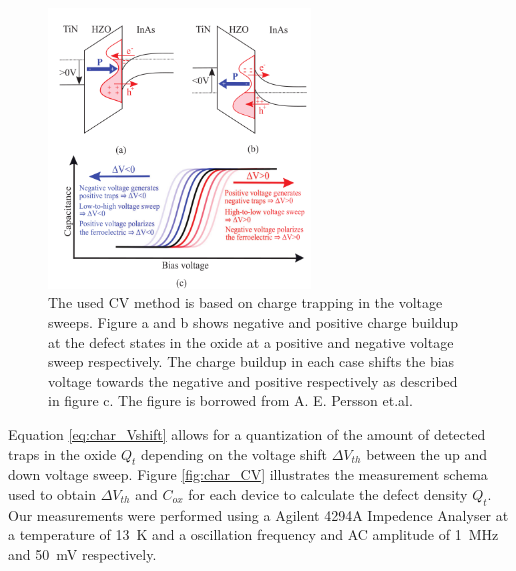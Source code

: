 \documentclass[11pt,twoside,final]{eitExjobb}  %
\begin{document}
\begin{figure}[htbp]
    \centering
    \includegraphics[width=0.62\textwidth]{fig/img/CV_hysteresis.png}
    \caption{The used CV method is based on charge trapping in the voltage
        sweeps. Figure a and b shows negative and positive charge buildup at
        the defect states in the oxide at a positive and negative voltage sweep
        respectively. The charge buildup in each case shifts the bias voltage
        towards the negative and positive respectively as described in figure
        c. The figure is borrowed from A. E. Persson et.al. \cite{persson2020method}}
    \label{fig:char_hysteresis}
\end{figure}

Equation \ref{eq:char_Vshift} allows for a quantization of the amount of
detected traps in the oxide $Q_t$ depending on the voltage shift $\Delta
V_{th}$ between the up and down voltage sweep. Figure \ref{fig:char_CV}
illustrates the measurement schema used to obtain $\Delta V_{th}$ and $C_{ox}$
for each device to calculate the defect density $Q_t$. Our measurements were
performed using a Agilent 4294A Impedence Analyser at a temperature of
\SI{13}{\kelvin} and a oscillation frequency and AC amplitude of
\SI{1}{\mega\hertz} and \SI{50}{\milli\volt} respectively.
\end{document}
